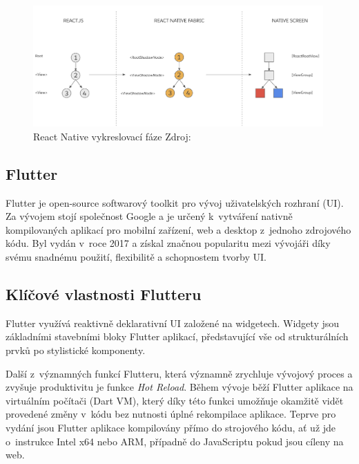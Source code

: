 \begin{figure}[H]
  \centering
  \includegraphics[width=0.99\textwidth]{react-native-render-pipeline.png}
  \caption{React Native vykreslovací fáze Zdroj: \cite{reactNativeRenderCommitMount}}
  \label{fig:react-native-render-pipeline}
\end{figure}

\subsection{Flutter}
Flutter je open-source softwarový toolkit pro vývoj uživatelských rozhraní (UI). \cite{flutterfaq} Za vývojem stojí společnost Google a je určený k~vytváření nativně kompilovaných 
aplikací pro mobilní zařízení, web a desktop z~jednoho zdrojového kódu. \cite{flutterfaq}
Byl vydán v~roce 2017 a získal značnou popularitu mezi vývojáři díky svému snadnému použití, flexibilitě a schopnostem tvorby UI.

\subsection*{Klíčové vlastnosti Flutteru}

Flutter využívá reaktivně deklarativní UI založené na widgetech. \cite{flutterUI} Widgety jsou základními stavebními 
bloky Flutter aplikací, představující vše od strukturálních prvků po stylistické komponenty. \cite{flutterWidgets}

Další z~významných funkcí Flutteru, která významně zrychluje vývojový proces a zvyšuje produktivitu je funkce \textit{Hot Reload}. 
Během vývoje běží Flutter aplikace na virtuálním počítači (Dart VM), který díky této funkci umožňuje okamžitě vidět provedené změny
v~kódu bez nutnosti úplné rekompilace aplikace. \cite{flutterHotReload} Teprve pro vydání jsou Flutter aplikace kompilovány přímo do strojového kódu, 
ať už jde o~instrukce Intel x64 nebo ARM, případně do JavaScriptu pokud jsou cíleny na web. \cite{flutterArchOverview}


